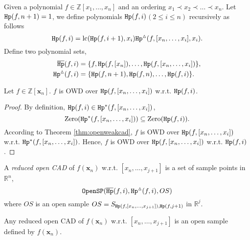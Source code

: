 \documentclass[amsthm]{elsart}
\def \lc  {{\rm lc}}
\def  \zero {{\rm Zero}}
\def  \Hproj {{\tt Hp}}
\def \RR {{\mathbb R}}
\def \ZZ {{\mathbb Z}}
\newcommand{\va}{\bm{\alpha}}
\newcommand{\xx}{\bm{x}}
\begin{document}
\begin{defn}
Given a polynomial $f\in\ZZ[x_1,\ldots,x_n]$ and an ordering $x_1\prec x_2\prec\ldots\prec x_n$.
Let $\Hproj(f,n+1)=1$, we define polynomials $\Hproj(f,i)$$(2\le i\le n)$ recursively as follows
 $$\Hproj(f,i)=\lc(\Hproj(f,i+1),x_{i}){\Hproj^{\vartriangle}(f,[x_n,\ldots,x_{i}],x_{i})}.$$
 Define two polynomial sets,
\begin{align*}
\overline{\Hproj}(f,i)  &=\{f,\Hproj(f,[x_{n}]), \ldots, \Hproj(f,[x_{n},\ldots,x_i])\},\\
{\Hproj^{\vartriangle}}(f,i) &=\{\Hproj(f,n+1),\Hproj(f,n),\ldots,\Hproj(f,i)\}.
\end{align*}
\end{defn}
\begin{thm}\label{thm:owdsp}
Let $f\in\ZZ[\xx_n]$. $f$ is OWD over $\Hproj(f,[x_n,\ldots,x_i])$ w.r.t. $\Hproj(f,i)$.
\end{thm}
\begin{proof}
  By definition, $\Hproj(f,i)\in{\Hproj^{\ast}(f,[x_n,\ldots,x_i])}$,
$$\zero({\Hproj^{\ast}(f,[x_n,\ldots,x_i])})\subseteq\zero(\Hproj(f,i)).$$
 According to Theorem \ref{thm:openweakcad}, $f$ is OWD over $\Hproj(f,[x_n,\ldots,x_i])$ w.r.t. ${\Hproj^{\ast}(f,[x_n,\ldots,x_{i}])}$. Hence, $f$ is OWD over $\Hproj(f,[x_n,\ldots,x_i])$ w.r.t. $\Hproj(f,i)$.
\end{proof}

\begin{defn}\label{de:reduced}
A {\em reduced open CAD} of $f(\xx_n)$ w.r.t. $[x_n,\ldots,x_{j+1}]$ is a set of sample points in $\RR^n$,
 $${\tt OpenSP}(\overline{\Hproj}(f,i),{\Hproj^{\vartriangle}}(f,i),OS)$$
 where $OS$ is an open sample $OS=S_{\Hproj(f,[x_n,\ldots,x_{j+1}]),\Hproj(f,j+1)}$ in $\RR^{j}$.
\end{defn}

\begin{comment}
\begin{algorithm}[h]
        \caption{{\tt ReducedOpenCAD}}  \label{de:reducedopencad}
        \begin{algorithmic}[1]
                \Require{$f(\xx_n)\in\ZZ[\xx_n]$ and an open sample $S_{\Hproj(f,[x_n,\ldots,x_{j+1}]),\Hproj(f,j+1)}$ in $\RR^{j}$} \Ensure{A set of sample points in $\RR^{n}$}
        \State $P_j:=S_{\Hproj(f,[x_n,\ldots,x_{j+1}]),\Hproj(f,j+1)}$
        \For {$i$ from $j+2$ to $n+1$}
        \State $P_{i-1}:=\emptyset$
        \For {$\va$ in $P_{i-2}$}
        \If {$i\le n$}
        \State {\small $P_{i-1}:=P_{i-1}\bigcup (\va\boxplus {\tt SPOne}(\Hproj(f,[x_n,\ldots,x_{i}])(\va,x_{i-1}), \Hproj(f,i)(\va,x_{i-1})))$}
        \Else \State {\small $P_{i-1}:=P_{i-1}\bigcup (\va\boxplus {\tt SPOne}(f(\va,x_{n}),\Hproj(f,n+1)(\va,x_n)))$}
        \EndIf
        \EndFor
\EndFor
        \State \Return $P_n$
        \end{algorithmic}
\end{algorithm}
\end{comment}
\begin{thm}\label{thm:reducedcad}
Any reduced open CAD of $f(\xx_n)$ w.r.t. $[x_n,\ldots,x_{j+1}]$ is an open sample defined by $f(\xx_n)$.
\end{thm}
\end{document}
